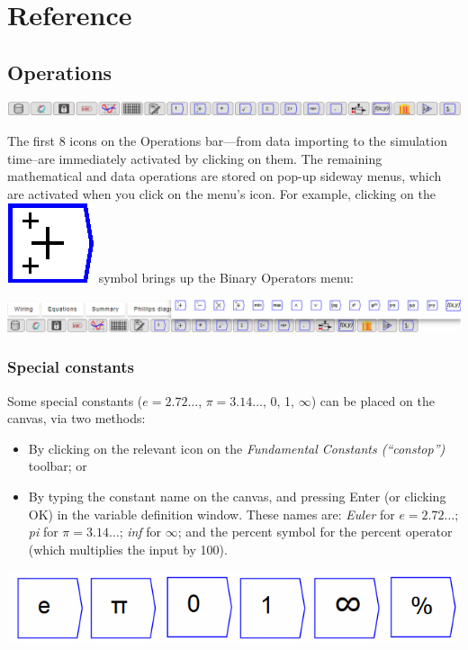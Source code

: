 
\chapter{Reference}

\section{Operations}

\label{Operations}

\includegraphics{images/DesignIcons}

The first 8 icons on the Operations bar---from data importing to
the simulation time--are immediately activated by clicking on them.
The remaining mathematical and data operations are stored on pop-up
sideway menus, which are activated when you click on the menu's icon.
For example, clicking on the \includegraphics{images/Plus} symbol
brings up the Binary Operators menu:

\includegraphics{images/DesignIconsWithBinaryOperatorsMenu}

\subsection{Special constants}

\label{Operation:euler}\label{Operation:pi}\label{Operation:zero}\label{Operation:one}
\label{Operation:inf}

Some special constants ($e=2.72\ldots$, $\pi=3.14\ldots$, 0, 1,
$\infty$) can be placed on the canvas, via two methods:
\begin{itemize}
\item By clicking on the relevant icon on the \emph{Fundamental Constants
(``constop'')} toolbar; or 
\item By typing the constant name on the canvas, and pressing Enter (or
clicking OK) in the variable definition window. These names are: \textit{Euler}
for $e=2.72\ldots$; \textit{pi} for $\pi=3.14\ldots$; \textit{inf}
for $\infty$; and the percent symbol for the percent operator (which
multiplies the input by 100).
\end{itemize}
\includegraphics{images/FundamentalConstants}


